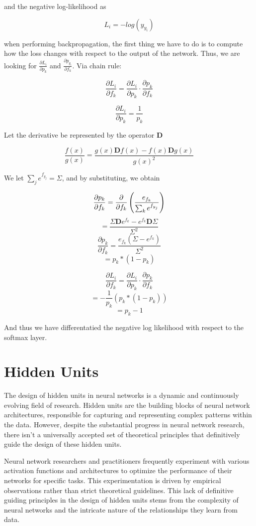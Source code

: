 \documentclass{report}
\begin{document}
and the negative log-likelihood as

$$L_i = -log(y_{y_i})$$

when performing backpropagation, the first thing we have to do is to compute how the loss changes with respect to the output of the network. Thus, we are looking for $\frac{\partial L_i}{\partial p_k}$ and $\frac{\partial p_{y_i}}{\partial f_k}$. Via chain rule:

$$\frac{\partial L_i}{\partial f_k} = \frac{\partial L_i}{\partial p_k}\cdot \frac{\partial p_k}{\partial f_k}$$

$$\frac{\partial L_i}{\partial p_k} = \frac{1}{p_k}$$

Let the derivative be represented by the operator $\mathbf{D}$

$$\frac{f(x)}{g(x)} = \frac{g(x) \mathbf{D} f(x) - f(x) \mathbf{D} g(x)}{g(x)^2}$$

We let $\sum_j e^{f_{y_j}} = \Sigma$, and by substituting, we obtain

$$\frac{\partial p_k}{\partial f_k} = \frac{\partial}{\partial f_k} \left( \frac{e_{f_k}}{\sum_k e^{f_{y_j}}}\right)$$
$$ = \frac{\Sigma \mathbf{D}e^{f_k} - e^{f_k} \mathbf{D}\Sigma}{\Sigma^2}$$
$$\frac{\partial p_k}{\partial f_k} = \frac{e_{f_k}(\Sigma - e^{f_k})}{\Sigma^2}$$
$$= p_k \ast (1 - p_k)$$

$$\frac{\partial L_i}{\partial f_k} = \frac{\partial L_i}{\partial p_k}\cdot \frac{\partial p_k}{\partial f_k}$$
$$= -\frac{1}{p_k}(p_k \ast (1-p_k))$$
$$= p_k - 1$$

And thus we have differentatied the negative log likelihood with respect to the softmax layer.

\section{Hidden Units}
The design of hidden units in neural networks is a dynamic and continuously evolving field of research. Hidden units are the building blocks of neural network architectures, responsible for capturing and representing complex patterns within the data. However, despite the substantial progress in neural network research, there isn't a universally accepted set of theoretical principles that definitively guide the design of these hidden units.

Neural network researchers and practitioners frequently experiment with various activation functions and architectures to optimize the performance of their networks for specific tasks. This experimentation is driven by empirical observations rather than strict theoretical guidelines. This lack of definitive guiding principles in the design of hidden units stems from the complexity of neural networks and the intricate nature of the relationships they learn from data.
\end{document}
